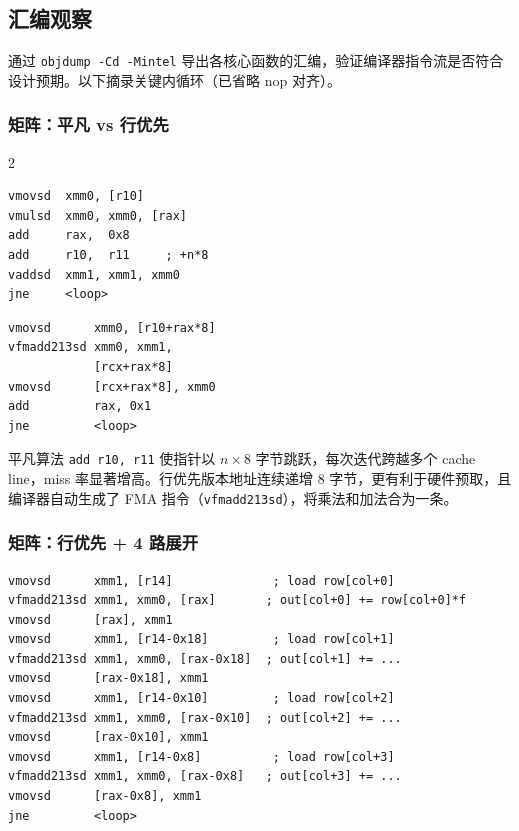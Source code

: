\documentclass[a4paper,11pt,UTF8]{ctexart}
\begin{document}
\subsection{汇编观察}
通过 \texttt{objdump -Cd -Mintel} 导出各核心函数的汇编，验证编译器指令流是否符合设计预期。以下摘录关键内循环（已省略 nop 对齐）。

\subsubsection{矩阵：平凡 vs 行优先}

\begin{multicols}{2}
\begin{lstlisting}[language={[x86masm]Assembler},caption=naive 内循环,basicstyle=\ttfamily\tiny,numbers=none]
vmovsd  xmm0, [r10]
vmulsd  xmm0, xmm0, [rax]
add     rax,  0x8
add     r10,  r11     ; +n*8
vaddsd  xmm1, xmm1, xmm0
jne     <loop>
\end{lstlisting}
\columnbreak
\begin{lstlisting}[language={[x86masm]Assembler},caption=row\_major 内循环,basicstyle=\ttfamily\tiny,numbers=none]
vmovsd      xmm0, [r10+rax*8]
vfmadd213sd xmm0, xmm1,
            [rcx+rax*8]
vmovsd      [rcx+rax*8], xmm0
add         rax, 0x1
jne         <loop>
\end{lstlisting}
\end{multicols}

平凡算法 \texttt{add r10, r11} 使指针以 $n \times 8$ 字节跳跃，每次迭代跨越多个 cache line，miss 率显著增高。行优先版本地址连续递增 8 字节，更有利于硬件预取，且编译器自动生成了 FMA 指令（\texttt{vfmadd213sd}），将乘法和加法合为一条。

\subsubsection{矩阵：行优先 + 4 路展开}
\begin{lstlisting}[language={[x86masm]Assembler},caption=unrolled4 内循环,basicstyle=\ttfamily\tiny,numbers=none]
vmovsd      xmm1, [r14]              ; load row[col+0]
vfmadd213sd xmm1, xmm0, [rax]       ; out[col+0] += row[col+0]*f
vmovsd      [rax], xmm1
vmovsd      xmm1, [r14-0x18]         ; load row[col+1]
vfmadd213sd xmm1, xmm0, [rax-0x18]  ; out[col+1] += ...
vmovsd      [rax-0x18], xmm1
vmovsd      xmm1, [r14-0x10]         ; load row[col+2]
vfmadd213sd xmm1, xmm0, [rax-0x10]  ; out[col+2] += ...
vmovsd      [rax-0x10], xmm1
vmovsd      xmm1, [r14-0x8]          ; load row[col+3]
vfmadd213sd xmm1, xmm0, [rax-0x8]   ; out[col+3] += ...
vmovsd      [rax-0x8], xmm1
jne         <loop>
\end{lstlisting}
\end{document}
